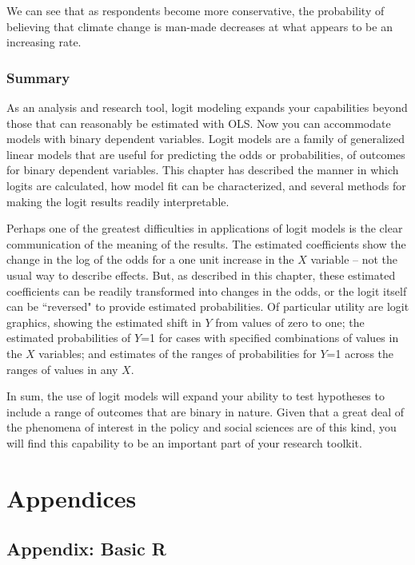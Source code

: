 \documentclass[11pt,openany]{book}\usepackage[]{graphicx}\usepackage[]{color}
\begin{document}
\noindent We can see that as respondents become more conservative, the probability of believing that climate change is man-made decreases at what appears to be an increasing rate.   

\section{Summary}

As an analysis and research tool, logit modeling expands your capabilities beyond those that can reasonably be estimated with OLS. Now you can accommodate  models with binary dependent variables. Logit models are a family of generalized linear models that are useful for predicting the odds or probabilities, of outcomes for binary dependent variables. This chapter has described the manner in which logits are calculated, how model fit can be  characterized, and several methods for making the logit results readily interpretable.

Perhaps one of the greatest difficulties in applications of logit models is the clear communication of the meaning of the results. The estimated coefficients show the change in the log of the odds for a one unit increase in the $X$ variable -- not the usual way to describe effects. But, as described in this chapter, these estimated coefficients can be readily transformed into changes in the odds, or the logit itself can be ``reversed" to provide estimated probabilities.  Of particular utility are logit graphics, showing the estimated shift in $Y$ from values of zero to one; the estimated probabilities of $Y$=1 for cases with specified combinations of values in the $X$ variables; and estimates of the ranges of probabilities for $Y$=1 across the ranges of values in any $X$. 

In sum, the use of logit models will expand your ability to test hypotheses to include a range of outcomes that are binary in nature. Given that a great deal of the phenomena of interest in the policy and social sciences are of this kind, you will find this capability to be an important part of your research toolkit. 

\part{Appendices}




\chapter{Appendix: Basic R}
\end{document}
